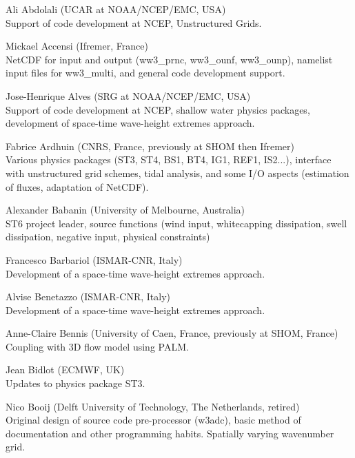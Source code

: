 \begin{list}{\ldots}{ }

\item [Ali Abdolali] (UCAR at NOAA/NCEP/EMC, USA) \\
  Support of code development at NCEP, Unstructured Grids.

\item [Mickael Accensi] (Ifremer, France) \\
  NetCDF for input and output (ww3\_prnc, ww3\_ounf, ww3\_ounp), namelist input files for ww3\_multi, and general code development support.

\item [Jose-Henrique Alves] (SRG at NOAA/NCEP/EMC, USA) \\
  Support of code development at NCEP, shallow water physics packages, development of space-time wave-height extremes approach.

\item [Fabrice Ardhuin] (CNRS, France, previously at SHOM then Ifremer) \\
  Various physics packages (ST3, ST4, BS1, BT4, IG1, REF1, IS2...), interface with unstructured grid schemes, tidal analysis, and some I/O aspects (estimation of fluxes, adaptation of NetCDF). 

\item [Alexander Babanin] (University of Melbourne, Australia)\\
  ST6 project leader, source functions (wind input, whitecapping dissipation, swell dissipation, negative input, physical constraints)

\item [Francesco Barbariol] (ISMAR-CNR, Italy) \\
  Development of a space-time wave-height extremes approach.

\item [Alvise Benetazzo] (ISMAR-CNR, Italy) \\
  Development of a space-time wave-height extremes approach.

\item [Anne-Claire Bennis] (University of Caen, France, previously at SHOM, France) \\
  Coupling with 3D flow model using PALM.

\item [Jean Bidlot] (ECMWF, UK) \\
  Updates to physics package ST3.

\item [Nico Booij] (Delft University of Technology, The Netherlands, retired) \\
  Original design of source code pre-processor ({\code w3adc}), basic method
  of documentation and other programming habits. Spatially varying wavenumber
  grid.


\end{list}
